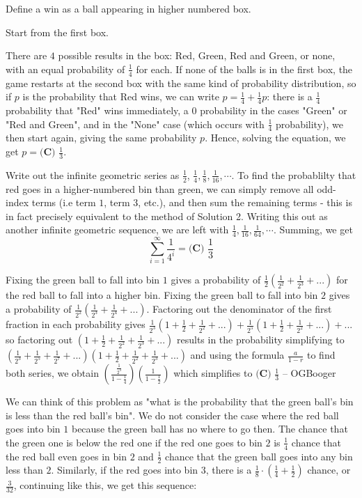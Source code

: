 \documentclass{article}%
\begin{document}
\begin{enumerate}
Define a win as a ball appearing in higher numbered box.

Start from the first box. 

There are $4$ possible results in the box: Red, Green, Red and Green, or none, with an equal probability of $\frac{1}{4}$ for each. If none of the balls is in the first box, the game restarts at the second box with the same kind of probability distribution, so if $p$ is the probability that Red wins, we can write $p = \frac{1}{4} + \frac{1}{4}p$: there is a $\frac{1}{4}$ probability that "Red" wins immediately, a $0$ probability in the cases "Green" or "Red and Green", and in the "None" case (which occurs with $\frac{1}{4}$ probability), we then start again, giving the same probability $p$. Hence, solving the equation, we get $p = \boxed{\textbf{(C) } \frac{1}{3}}$.

Write out the infinite geometric series as $\frac{1}{2}$, $\frac{1}{4}, \frac{1}{8}, \frac{1}{16}, \cdots$. To find the probablilty that red goes in a higher-numbered bin than green, we can simply remove all odd-index terms (i.e term $1$, term $3$, etc.), and then sum the remaining terms - this is in fact precisely equivalent to the method of Solution 2. Writing this out as another infinite geometric sequence, we are left with $\frac{1}{4}, \frac{1}{16}, \frac{1}{64}, \cdots$. Summing, we get \[\sum_{i=1}^{\infty} \frac{1}{4^i} = \boxed{\textbf{(C) } \frac{1}{3}}\]

Fixing the green ball to fall into bin $1$ gives a probability of $\frac{1}{2}\left(\frac{1}{2^2}+\frac{1}{2^3} +...\right)$ for the red ball to fall into a higher bin. Fixing the green ball to fall into bin $2$ gives a probability of $\frac{1}{2^2}\left(\frac{1}{2^3}+\frac{1}{2^4} +...\right)$. Factoring out the denominator of the first fraction in each probability gives $\frac{1}{2^3}\left(1+\frac{1}{2}+\frac{1}{2^2}+...\right)+\frac{1}{2^5}\left(1+\frac{1}{2}+\frac{1}{2^2}+...\right)+...$ so factoring out $\left(1+\frac{1}{2}+\frac{1}{2^2}+\frac{1}{2^3}+...\right)$ results in the probability simplifying to $\left(\frac{1}{2^3}+\frac{1}{2^5}+\frac{1}{2^7}+...\right)\left(1+\frac{1}{2}+\frac{1}{2^2}+\frac{1}{2^3}+...\right)$ and using the formula $\frac{a}{1-r}$ to find both series, we obtain $\left(\frac{\frac{1}{2^3}}{1-\frac{1}{4}}\right)\left(\frac{1}{1-\frac{1}{2}}\right)$ which simplifies to $\boxed{\textbf{(C) } \frac{1}{3}}$ -- OGBooger

We can think of this problem as "what is the probability that the green ball's bin is less than the red ball's bin". We do not consider the case where the red ball goes into bin $1$ because the green ball has no where to go then. The chance that the green one is below the red one if the red one goes to bin $2$ is $\frac{1}{4}$ chance that the red ball even goes in bin $2$ and $\frac{1}{2}$ chance that the green ball goes into any bin less than $2$. Similarly, if the red goes into bin $3$, there is a $\frac{1}{8} \cdot \left(\frac{1}{4} + \frac{1}{2}\right)$ chance, or $\frac{3}{32}$, continuing like this, we get this sequence:


\end{enumerate}
\end{document}
